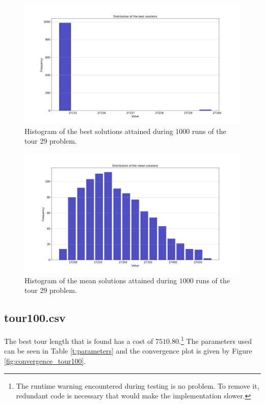 \documentclass[a4paper,10pt]{article}
\begin{document}
\begin{figure}[h!]
	\includegraphics[width=1\textwidth]{hist_best.PNG}
	\caption{Histogram of the best solutions attained during $ 1000 $ runs of the tour 29 problem.}
	\label{fig:hist_best_sol}
	\centering
\end{figure}


\begin{figure}[h!]
	\includegraphics[width=1\textwidth]{hist_mean.PNG}
	\caption{Histogram of the mean solutions attained during $ 1000 $ runs of the tour 29 problem.}
	\label{fig:hist_mean_sol}
	\centering
\end{figure}


\clearpage

\subsection{tour100.csv}
The best tour length that is found has a cost of $ 7510.80 $.\footnote{The runtime warning encountered during testing is no problem. To remove it, redundant code is necessary that would make the implementation slower. }
The parameters used can be seen in Table \ref{t:parameters} and the convergence plot is given by Figure \ref{fig:convergence_tour100}.
\end{document}
